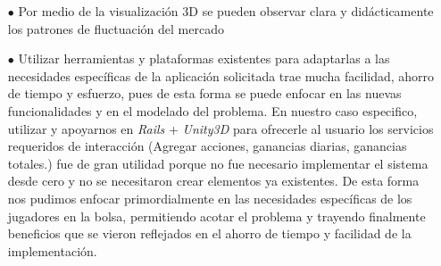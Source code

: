 \documentclass[twocolumn]{article}
\begin{document}
\begin{itemize}
\item[$\bullet$] Por medio de la visualización 3D se pueden observar clara y didácticamente los patrones de fluctuación del mercado	

\item[$\bullet$] Utilizar herramientas y plataformas existentes para adaptarlas a las necesidades específicas de la aplicación solicitada trae mucha facilidad, ahorro de tiempo y esfuerzo, pues de esta forma se puede enfocar en las nuevas funcionalidades y en el modelado del problema. En nuestro caso especifico, utilizar y apoyarnos en \emph{Rails} + \emph{Unity3D} para ofrecerle al usuario los servicios requeridos de interacción (Agregar acciones, ganancias diarias, ganancias totales.) fue de gran utilidad porque no fue necesario implementar el sistema desde cero y no se necesitaron crear elementos ya existentes. De esta forma nos pudimos enfocar primordialmente en las necesidades específicas de los jugadores en la bolsa, permitiendo acotar el problema y trayendo finalmente beneficios que se vieron reflejados en el ahorro de tiempo y facilidad de la implementación.	
	
\end{itemize}



%
\end{document}

